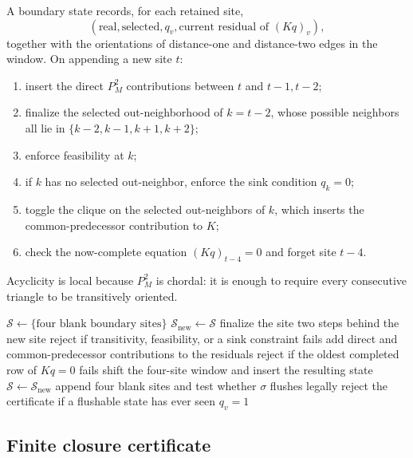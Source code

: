 \documentclass[10pt,letterpaper]{article}
\begin{document}
A boundary state records, for each retained site,
\[
 (\text{real},\text{selected},q_v,\text{current residual of }(Kq)_v),
\]
together with the orientations of distance-one and distance-two edges in the window.  On appending a new site \(t\):
\begin{enumerate}
\item insert the direct \(P_M^2\) contributions between \(t\) and \(t-1,t-2\);
\item finalize the selected out-neighborhood of \(k=t-2\), whose possible neighbors all lie in \(\{k-2,k-1,k+1,k+2\}\);
\item enforce feasibility at \(k\);
\item if \(k\) has no selected out-neighbor, enforce the sink condition \(q_k=0\);
\item toggle the clique on the selected out-neighbors of \(k\), which inserts the common-predecessor contribution to \(K\);
\item check the now-complete equation \((Kq)_{t-4}=0\) and forget site \(t-4\).
\end{enumerate}
Acyclicity is local because \(P_M^2\) is chordal: it is enough to require every consecutive triangle to be transitively oriented.

\begin{algorithm}[t]
\caption{Four-site sink-nullity scan}\label{alg:sink-scan}
\begin{algorithmic}[1]
\State \(\mathcal S\gets\{\text{four blank boundary sites}\}\)
\Repeat
  \State \(\mathcal S_{\mathrm{new}}\gets\mathcal S\)
      \State finalize the site two steps behind the new site
      \State reject if transitivity, feasibility, or a sink constraint fails
      \State add direct and common-predecessor contributions to the residuals
      \State reject if the oldest completed row of \(Kq=0\) fails
      \State shift the four-site window and insert the resulting state
    \EndFor
  \EndFor
  \State \(\mathcal S\gets\mathcal S_{\mathrm{new}}\)
  \State append four blank sites and test whether \(\sigma\) flushes legally
\EndFor
\State reject the certificate if a flushable state has ever seen \(q_v=1\)
\end{algorithmic}
\end{algorithm}

\subsection{Finite closure certificate}
\end{document}
